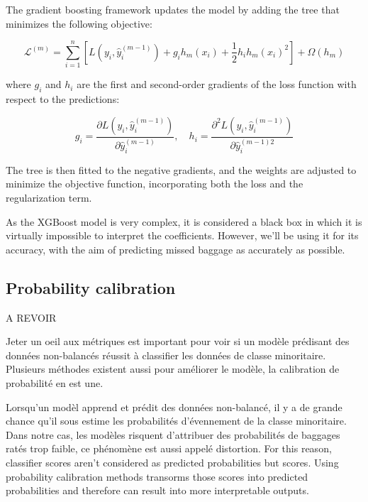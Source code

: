 \documentclass[12pt]{article}
\begin{document}
\noindent The gradient boosting framework updates the model by adding the tree that minimizes the following objective:
 
\begin{equation}\mathcal{L}^{(m)} = \sum_{i=1}^{n} \left[ L(y_i, \hat{y}_i^{(m-1)}) + g_i h_m(x_i) + \frac{1}{2} h_i h_m(x_i)^2 \right] + \Omega(h_m)
\end{equation}
 
where $g_i$ and $h_i$ are the first and second-order gradients of the loss function with respect to the predictions:
 
\begin{equation}\label{equa:test}
g_i = \frac{\partial L(y_i, \hat{y}_i^{(m-1)})}{\partial \hat{y}_i^{(m-1)}}, \quad h_i = \frac{\partial^2 L(y_i, \hat{y}_i^{(m-1)})}{\partial \hat{y}_i^{(m-1)2}}    
\end{equation}

 
The tree is then fitted to the negative gradients, and the weights are adjusted to minimize the objective function, incorporating both the loss and the regularization term. \hfill \break



As the XGBoost model is very complex, it is considered a black box in which it is virtually impossible to interpret the coefficients. However, we'll be using it for its accuracy, with the aim of predicting missed baggage as accurately as possible.


\subsection{Probability calibration}
\label{subsec:Probability calibration}
A REVOIR

Jeter un oeil aux métriques est important pour voir si un modèle prédisant des données non-balancés réussit à classifier les données de classe minoritaire. Plusieurs méthodes existent aussi pour améliorer le modèle, la calibration de probabilité en est une. 

Lorsqu'un modèl apprend et prédit des données non-balancé, il y a de grande chance qu'il sous estime les probabilités d'évennement de la classe minoritaire. Dans notre cas, les modèles risquent d'attribuer des probabilités de baggages ratés trop faible, ce phénomène est aussi appelé distortion. For this reason, classifier scores aren't considered as predicted probabilities but scores.
Using probability calibration methods transorms those scores into predicted probabilities and therefore can result into more interpretable outputs.
\end{document}
